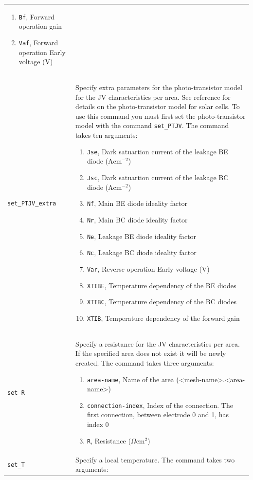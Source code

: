 \documentclass[noshowpacs,preprintnumbers,amsmath,amssymb, letter]{revtex4}
\begin{document}
\begin{longtable}{p{}p{}}
\begin{enumerate}
\item \texttt{Bf},  Forward operation gain 
\item \texttt{Vaf},  Forward operation Early voltage (V)
\end{enumerate}\\
\texttt{set\_PTJV\_extra}	&  Specify extra parameters for the photo-transistor model for the JV characteristics per area. See reference \cite{Walter:photo-T} for details on the photo-transistor model for solar cells. To use this command you must first set the photo-transistor model with the command \texttt{set\_PTJV}. The command takes ten arguments:
\begin{enumerate}
\item \texttt{Jse},  Dark satuartion current of the leakage BE diode ($\text{A}\text{cm}^{-2}$)
\item \texttt{Jsc},  Dark satuartion current of the leakage BC diode ($\text{A}\text{cm}^{-2}$)
\item \texttt{Nf},  Main BE diode ideality factor 
\item \texttt{Nr},  Main BC diode ideality factor 
\item \texttt{Ne},  Leakage BE diode ideality factor 
\item \texttt{Nc},  Leakage BC diode ideality factor
\item \texttt{Var},  Reverse operation Early voltage (V)
\item \texttt{XTIBE},  Temperature dependency of the BE diodes 
\item \texttt{XTIBC},  Temperature dependency of the BC diodes 
\item \texttt{XTIB},  Temperature dependency of the forward gain 
\end{enumerate}\\
\texttt{set\_R}	&  Specify a resistance for the JV characteristics per area. If the specified area does not exist it will be newly created. The command takes three arguments:
\begin{enumerate}
\item \texttt{area-name}, Name of the area (\textless mesh-name\textgreater .\textless area-name\textgreater )
\item \texttt{connection-index}, Index of the connection. The first connection, between electrode 0 and 1,  has index 0
\item \texttt{R}, Resistance ($\Omega \text{cm}^2$)
\end{enumerate}\\
\texttt{set\_T}	&  Specify a local temperature. The command takes two arguments:

\end{longtable}
\end{document}
